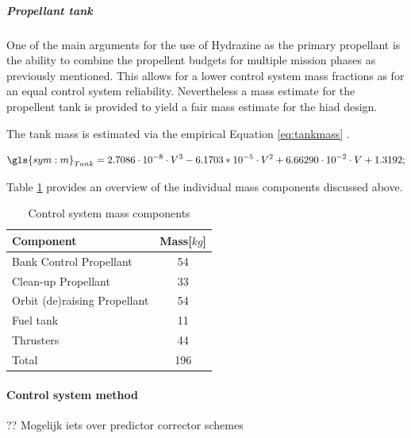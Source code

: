\subparagraph{Propellant tank}

One of the main arguments for the use of Hydrazine as the primary propellant is the ability to combine the propellent budgets for multiple mission phases as previously mentioned. This allows for a lower control system mass fractions as for an equal control system reliability. Nevertheless a mass estimate for the propellent tank is provided to yield a fair mass estimate for the \gls{hiad} design. 

The tank mass is estimated via the empirical Equation \ref{eq:tankmass} \cite[p. 543]{Wertz2011}.

\begin{equation}
\label{eq:tankmass} 
\gls{sym:m}_{Tank}=2.7086 \cdot 10^{-8} \cdot V^3 -6.1703*10^{-5} \cdot V^2 +6.66290 \cdot 10^{-2}  \cdot V +1.3192;
\end{equation}


Table \ref{tab:controlmassbreakdown} provides an overview of the individual mass components discussed above. 

\begin{table}[h]
\centering
\caption{Control system mass components}
\label{tab:controlmassbreakdown}
\begin{tabular}{|l|c|} \hline
\textbf{Component}                 & \textbf{Mass[$kg$]} \\ \hline
Bank Control Propellant      &     54       \\ \hline
Clean-up Propellant          &     33       \\ \hline
Orbit (de)raising Propellant &     54       \\ \hline
Fuel tank              		 &     11      \\ \hline
Thrusters                	 &     44     \\ \hline \hline
Total                        &     196      \\ \hline
\end{tabular}
\end{table}

\paragraph{Control system method}

?? Mogelijk iets over predictor corrector schemes




